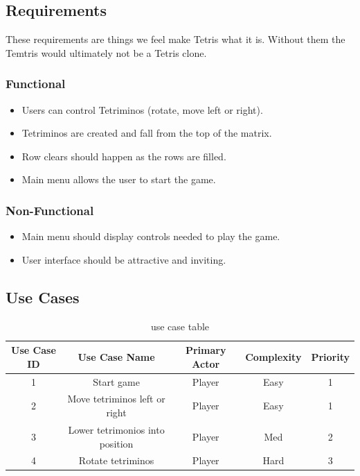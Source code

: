 \documentclass[10pt,conference,onecolumn,compsoc]{IEEEtran}
\begin{document}
\subsection{Requirements}
These requirements are things we feel make Tetris what it is. Without them the Temtris would ultimately not be a Tetris clone.

\subsubsection{Functional}
\begin{itemize}
\item Users can control Tetriminos (rotate, move left or right).
\item Tetriminos are created and fall from the top of the matrix.
\item Row clears should happen as the rows are filled.
\item Main menu allows the user to start the game.
\end{itemize}

\subsubsection{Non-Functional}
\begin{itemize}
\item Main menu should display controls needed to play the game.
\item User interface should be attractive and inviting.
\end{itemize}

\subsection{Use Cases}
\begin{table}[h!]
\centering
\begin{tabular}{|c|c|c|c|c|}
\hline
Use Case ID & Use Case Name & Primary Actor & Complexity & Priority \\
\hline \hline
1 & Start game & Player & Easy & 1\\
\hline
2 & Move tetriminos left or right & Player & Easy & 1\\
\hline
3 & Lower tetrimonios into position & Player & Med & 2\\
\hline
4 & Rotate tetriminos & Player & Hard & 3\\
\hline
\end{tabular}
\caption{use case table}
\label{tab:useCaseIndex}
\end{table}
\end{document}
